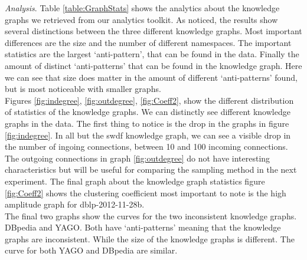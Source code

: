 \documentclass[11pt,letterpaper ,oneside ]{book}
\begin{document}
	\textit{Analysis}. Table \ref{table:GraphStats} shows the analytics about the knowledge graphs we retrieved from our analytics toolkit. As noticed, the results show several distinctions between the three different knowledge graphs. Most important differences are the size and the number of different namespaces. The important statistics are the largest `anti-pattern', that can be found in the data. Finally the amount of distinct `anti-patterns' that can be found in the knowledge graph. Here we can see that size does matter in the amount of different `anti-patterns' found, but is most noticeable with smaller graphs. \\
	Figures \ref{fig:indegree},  \ref{fig:outdegree},  \ref{fig:Coeff2}, show the different distribution of statistics of the knowledge graphs. We can distinctly see different knowledge graphs in the data. The first thing to notice is the drop in the graphs in figure \ref{fig:indegree}. In all but the swdf knowledge graph, we can see a visible drop in the number of ingoing connections, between 10 and 100 incoming connections. \\
	The outgoing connections in graph \ref{fig:outdegree} do not have interesting characteristics but will be useful for comparing the sampling method in the next experiment. 
	The final graph about the knowledge graph statistics figure \ref{fig:Coeff2} shows the clustering coefficient most important to note is the high amplitude graph for dblp-2012-11-28b. \\
	The final two graphs show the curves for the two inconsistent knowledge graphs. DBpedia and YAGO. Both have `anti-patterns' meaning that the knowledge graphs are inconsistent. While the size of the knowledge graphs is different. The curve for both YAGO and DBpedia are similar. 
	
\end{document}
